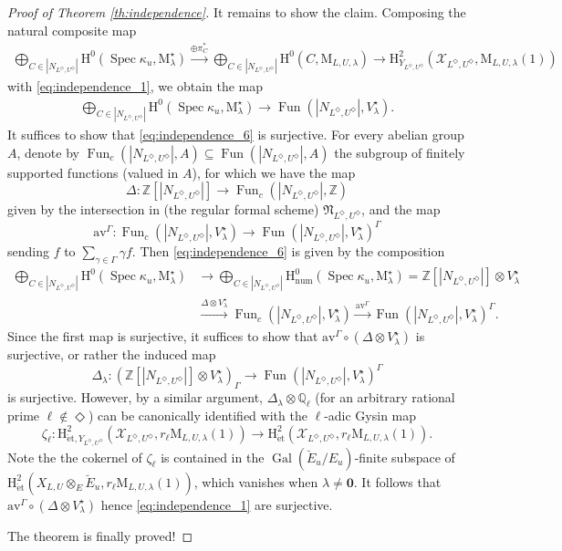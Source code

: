 \documentclass[12pt]{amsart}
\numberwithin{equation}{section}
\theoremstyle{plain}
\theoremstyle{definition}
\theoremstyle{remark}
\renewcommand{\b}[1]{\mathbf{#1}}
\renewcommand{\c}[1]{\mathcal{#1}}
\renewcommand{\d}[1]{\mathbb{#1}}
\newcommand{\f}[1]{\mathfrak{#1}}
\renewcommand{\r}[1]{\mathrm{#1}}
\renewcommand{\(}{\left(}
\renewcommand{\)}{\right)}
\newcommand{\cX}{\c X}
\newcommand{\dQ}{\d Q}
\newcommand{\dZ}{\d Z}
\newcommand{\fN}{\f N}
\newcommand{\rH}{\r H}
\newcommand{\rM}{\r M}
\newcommand{\et}{{\acute{\r{e}}\r{t}}}
\newcommand{\num}{\r{num}}
\DeclareMathOperator{\Fun}{Fun}
\DeclareMathOperator{\Gal}{Gal}
\DeclareMathOperator{\Spec}{Spec}
\begin{document}
\begin{proof}[Proof of Theorem \ref{th:independence}]
It remains to show the claim. Composing the natural composite map
\begin{align*}
\bigoplus_{C\in|N_{L^\Diamond,U^\Diamond}|}\rH^0(\Spec\kappa_u,\rM^\star_\lambda)
\xrightarrow{\oplus\pi_C^*}
\bigoplus_{C\in|N_{L^\Diamond,U^\Diamond}|}\rH^0(C,\rM_{L,U,\lambda})\to
\rH^2_{Y_{L^\Diamond,U^\Diamond}}(\cX_{L^\Diamond,U^\Diamond},\rM_{L,U,\lambda}(1))
\end{align*}
with \eqref{eq:independence_1}, we obtain the map
\begin{align}\label{eq:independence_6}
\bigoplus_{C\in|N_{L^\Diamond,U^\Diamond}|}\rH^0(\Spec\kappa_u,\rM^\star_\lambda)
\to\Fun(|N_{L^\Diamond,U^\Diamond}|,V^\star_\lambda).
\end{align}
It suffices to show that \eqref{eq:independence_6} is surjective. For every abelian group $A$, denote by $\Fun_c(|N_{L^\Diamond,U^\Diamond}|,A)\subseteq\Fun(|N_{L^\Diamond,U^\Diamond}|,A)$ the subgroup of finitely supported functions (valued in $A$), for which we have the map
\[
\Delta\colon\dZ[|N_{L^\Diamond,U^\Diamond}|]\to\Fun_c(|N_{L^\Diamond,U^\Diamond}|,\dZ)
\]
given by the intersection in (the regular formal scheme) $\fN_{L^\Diamond,U^\Diamond}$, and the map
\[
\r{av}^\Gamma\colon\Fun_c(|N_{L^\Diamond,U^\Diamond}|,V^\star_\lambda)\to
\Fun(|N_{L^\Diamond,U^\Diamond}|,V^\star_\lambda)^\Gamma
\]
sending $f$ to $\sum_{\gamma\in\Gamma}\gamma f$. Then \eqref{eq:independence_6} is given by the composition
\begin{align*}
\bigoplus_{C\in|N_{L^\Diamond,U^\Diamond}|}\rH^0(\Spec\kappa_u,\rM^\star_\lambda)
&\to\bigoplus_{C\in|N_{L^\Diamond,U^\Diamond}|}\rH^0_\num(\Spec\kappa_u,\rM^\star_\lambda)
=\dZ[|N_{L^\Diamond,U^\Diamond}|]\otimes V^\star_\lambda \\
&\xrightarrow{\Delta\otimes V^\star_\lambda}
\Fun_c(|N_{L^\Diamond,U^\Diamond}|,V^\star_\lambda)\xrightarrow{\r{av}^\Gamma}
\Fun(|N_{L^\Diamond,U^\Diamond}|,V^\star_\lambda)^\Gamma.
\end{align*}
Since the first map is surjective, it suffices to show that $\r{av}^\Gamma\circ(\Delta\otimes V^\star_\lambda)$ is surjective, or rather the induced map
\[
\Delta_\lambda\colon\(\dZ[|N_{L^\Diamond,U^\Diamond}|]\otimes V^\star_\lambda\)_\Gamma
\to\Fun(|N_{L^\Diamond,U^\Diamond}|,V^\star_\lambda)^\Gamma
\]
is surjective. However, by a similar argument, $\Delta_\lambda\otimes\dQ_\ell$ (for an arbitrary rational prime $\ell\not\in\Diamond$) can be canonically identified with the $\ell$-adic Gysin map
\[
\zeta_\ell\colon\rH^2_{\et,Y_{L^\Diamond,U^\Diamond}}(\cX_{L^\Diamond,U^\Diamond},r_\ell\rM_{L,U,\lambda}(1))\to
\rH^2_{\et}(\cX_{L^\Diamond,U^\Diamond},r_\ell\rM_{L,U,\lambda}(1)).
\]
Note the the cokernel of $\zeta_\ell$ is contained in the $\Gal(\breve{E}_u/E_u)$-finite subspace of $\rH^2_{\et}(X_{L,U}\otimes_E\breve{E}_u,r_\ell\rM_{L,U,\lambda}(1))$, which vanishes when $\lambda\neq\b{0}$. It follows that $\r{av}^\Gamma\circ(\Delta\otimes V^\star_\lambda)$ hence \eqref{eq:independence_1} are surjective.

The theorem is finally proved!
\end{proof}
\end{document}

